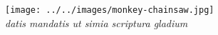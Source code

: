 \begin{center}
\texttt{[image: ../../images/monkey-chainsaw.jpg]}\\
\emph{datis mandatis ut simia scriptura gladium}
\end{center}
